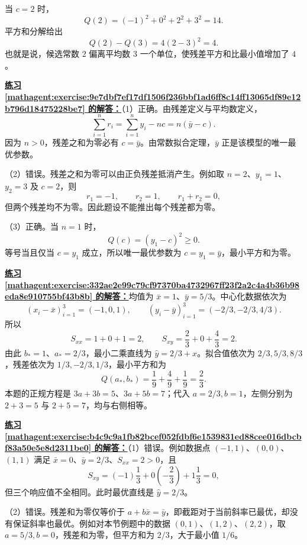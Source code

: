 \documentclass[UTF8,fontset=fandol,11pt]{ctexart}
\begin{document}
当 $c=2$ 时，
\[
Q(2)=(-1)^2+0^2+2^2+3^2=14.
\]
平方和分解给出
\[
Q(2)-Q(3)=4(2-3)^2=4.
\]
也就是说，候选常数 $2$ 偏离平均数 $3$ 一个单位，使残差平方和比最小值增加了 $4$。\par
\par\noindent\textbf{\hyperref[mathagent:exercise:9e7dbf7ef17df1506f236bbf1ad6ff8c14ff13065df89e12b796d18475228be7]{练习 \ref*{mathagent:exercise:9e7dbf7ef17df1506f236bbf1ad6ff8c14ff13065df89e12b796d18475228be7} 的解答：}}（1）正确。由残差定义与平均数定义，
\[
\sum_{i=1}^{n}r_i=\sum_{i=1}^{n}y_i-nc=n(\bar{y}-c).
\]
因为 $n>0$，残差之和为零必有 $c=\bar{y}$。由常数拟合定理，$\bar{y}$ 正是该模型的唯一最优参数。

（2）错误。残差之和为零可以由正负残差抵消产生。例如取 $n=2$、$y_1=1$、$y_2=3$ 及 $c=2$，则
\[
r_1=-1,\qquad r_2=1,\qquad r_1+r_2=0,
\]
但两个残差均不为零。因此题设不能推出每个残差都为零。

（3）正确。当 $n=1$ 时，
\[
Q(c)=(y_1-c)^2\geq0.
\]
等号当且仅当 $c=y_1$ 成立，所以唯一最优参数为 $c=y_1=\bar{y}$，最小平方和为零。\par
\par\noindent\textbf{\hyperref[mathagent:exercise:332ae2e99c79cf97370ba4732967ff23f2a2c4a4b36b98eda8e910755bf43b8b]{练习 \ref*{mathagent:exercise:332ae2e99c79cf97370ba4732967ff23f2a2c4a4b36b98eda8e910755bf43b8b} 的解答：}}均值为 $\bar{x}=1$、$\bar{y}=5/3$。中心化数据依次为
\[
(x_i-\bar{x})_{i=1}^{3}=(-1,0,1),\qquad
(y_i-\bar{y})_{i=1}^{3}=(-2/3,-2/3,4/3).
\]
所以
\[
S_{xx}=1+0+1=2,\qquad S_{xy}=\frac23+0+\frac43=2.
\]
由此 $b_*=1$、$a_*=2/3$，最小二乘直线为 $\hat{y}=2/3+x$。拟合值依次为 $2/3,5/3,8/3$，残差依次为 $1/3,-2/3,1/3$，最小平方和为
\[
Q(a_*,b_*)=\frac19+\frac49+\frac19=\frac23.
\]
本题的正规方程是 $3a+3b=5$、$3a+5b=7$；代入 $a=2/3,b=1$，左侧分别为 $2+3=5$ 与 $2+5=7$，均与右侧相等。\par
\par\noindent\textbf{\hyperref[mathagent:exercise:b4c9c9a1fb82bcef052fdbf6e1539831ed88cee016dbcbf83a50e5e8d2311be0]{练习 \ref*{mathagent:exercise:b4c9c9a1fb82bcef052fdbf6e1539831ed88cee016dbcbf83a50e5e8d2311be0} 的解答：}}（1）错误。例如数据点 $(-1,1)$、$(0,0)$、$(1,1)$ 满足 $\bar{x}=0$、$\bar{y}=2/3$、$S_{xx}=2>0$，且
\[
S_{xy}=(-1)\frac13+0\left(-\frac23\right)+1\frac13=0,
\]
但三个响应值不全相同。此时最优直线是 $\hat{y}=2/3$。

（2）错误。残差和为零仅等价于 $a+b\bar{x}=\bar{y}$，即截距对于当前斜率已最优，却没有保证斜率也最优。例如对本节例题中的数据 $(0,1)$、$(1,2)$、$(2,2)$，取 $a=5/3,b=0$，残差和为零，但平方和为 $2/3$，大于最小值 $1/6$。
\end{document}
